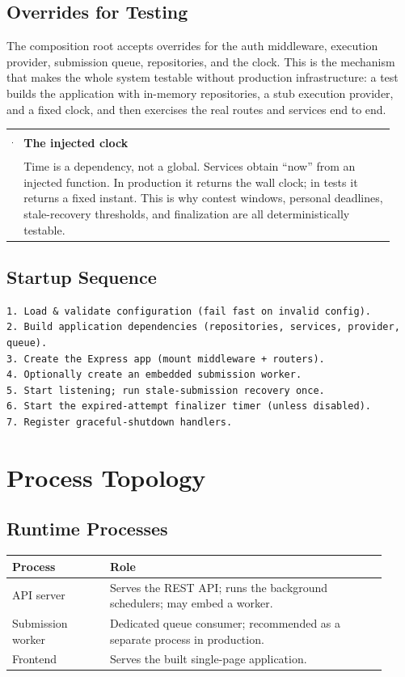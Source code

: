 \documentclass[12pt,a4paper,oneside]{report}
\makeatletter
\newenvironment{callout}[1]{\par\vspace{4pt}\noindent
  \begin{tabular}{@{}p{0.014\linewidth}@{\hspace{0.6em}}p{0.93\linewidth}@{}}
  \textcolor{boxframe}{\rule{2pt}{\baselineskip}} & \textbf{\textcolor{tcetblue}{#1}}\\[2pt] & }{\end{tabular}\par\vspace{6pt}}
\makeatother
\begin{document}
\section{Overrides for Testing}
The composition root accepts overrides for the auth middleware, execution
provider, submission queue, repositories, and the clock. This is the mechanism
that makes the whole system testable without production infrastructure: a test
builds the application with in-memory repositories, a stub execution provider,
and a fixed clock, and then exercises the real routes and services end to end.

\begin{callout}{The injected clock}
Time is a dependency, not a global. Services obtain ``now'' from an injected
function. In production it returns the wall clock; in tests it returns a fixed
instant. This is why contest windows, personal deadlines, stale-recovery
thresholds, and finalization are all deterministically testable.
\end{callout}

\section{Startup Sequence}
\begin{lstlisting}[language={}]
1. Load & validate configuration (fail fast on invalid config).
2. Build application dependencies (repositories, services, provider, queue).
3. Create the Express app (mount middleware + routers).
4. Optionally create an embedded submission worker.
5. Start listening; run stale-submission recovery once.
6. Start the expired-attempt finalizer timer (unless disabled).
7. Register graceful-shutdown handlers.
\end{lstlisting}

\chapter{Process Topology}
\section{Runtime Processes}
\begin{longtable}{@{}p{0.24\linewidth} p{0.68\linewidth}@{}}
\toprule
\textbf{Process} & \textbf{Role}\\
\midrule
\endhead
API server & Serves the REST API; runs the background schedulers; may embed a worker.\\
Submission worker & Dedicated queue consumer; recommended as a separate process in production.\\
Frontend & Serves the built single-page application.\\
\bottomrule
\end{longtable}
\end{document}
